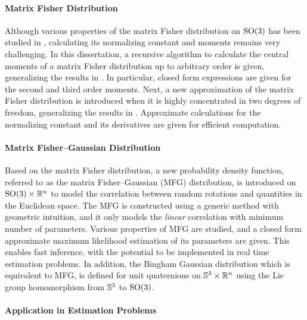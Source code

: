 \paragraph{Matrix Fisher Distribution}

Although various properties of the matrix Fisher distribution on $\mathrm{SO}(3)$ has been studied in \cite{downs1972orientation,khatri1977mises,lee2018bayesian}, calculating its normalizing constant and moments remains very challenging.
In this dissertation, a recursive algorithm to calculate the central moments of a matrix Fisher distribution up to arbitrary order is given, generalizing the results in \cite{khatri1977mises,lee2018bayesian}.
In particular, closed form expressions are given for the second and third order moments.
Next, a new approximation of the matrix Fisher distribution is introduced when it is highly concentrated in two degrees of freedom, generalizing the results in \cite{lee2018bayesian-b}.
Approximate calculations for the normalizing constant and its derivatives are given for efficient computation.

\paragraph{Matrix Fisher--Gaussian Distribution}

Based on the matrix Fisher distribution, a new probability density function, referred to as the matrix Fisher--Gaussian (MFG) distribution, is introduced on $\mathrm{SO}(3)\times \mathbb{R}^n$ to model the correlation between random rotations and quantities in the Euclidean space.
The MFG is constructed using a generic method with geometric intuition, and it only models the \textit{linear} correlation with minimum number of parameters.
Various properties of MFG are studied, and a closed form approximate maximum likelihood estimation of its parameters are given.
This enables fast inference, with the potential to be implemented in real time estimation problems.
In addition, the Bingham Gaussian distribution which is equivalent to MFG, is defined for unit quaternions on $\mathbb{S}^3\times \mathbb{R}^n$ using the Lie group homomorphism from $\mathbb{S}^3$ to $\mathrm{SO}(3)$.

\paragraph{Application in Estimation Problems}

